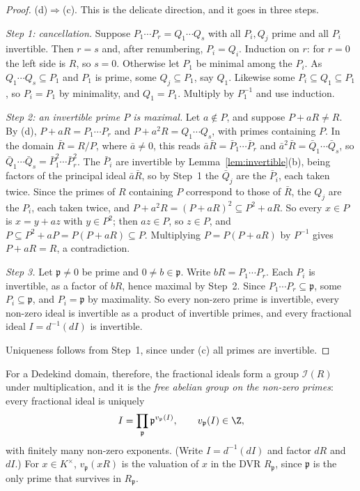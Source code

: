 \begin{proof}
(d)$\Rightarrow$(c). This is the delicate direction, and it goes in three steps.

\emph{Step 1: cancellation.} Suppose $P_1\cdots P_r=Q_1\cdots Q_s$ with all $P_i,Q_j$ prime and all $P_i$ invertible. Then $r=s$ and, after renumbering, $P_i=Q_i$. Induction on $r$: for $r=0$ the left side is $R$, so $s=0$.
Otherwise let $P_1$ be minimal among the $P_i$. As $Q_1\cdots Q_s\subseteq P_1$ and $P_1$ is prime, some $Q_j\subseteq P_1$, say $Q_1$. Likewise some $P_i\subseteq Q_1\subseteq P_1$, so $P_i=P_1$ by minimality, and $Q_1=P_1$. Multiply by $P_1^{-1}$ and use induction.

\emph{Step 2: an invertible prime $P$ is maximal.} Let $a\notin P$, and suppose $P+aR\ne R$. By (d), $P+aR=P_1\cdots P_r$ and $P+a^2R=Q_1\cdots Q_s$, with primes containing $P$. In the domain $\bar R=R/P$, where $\bar a\ne0$,
this reads $\bar a\bar R=\bar P_1\cdots\bar P_r$ and $\bar a^2\bar R=\bar Q_1\cdots\bar Q_s$, so $\bar Q_1\cdots\bar Q_s=\bar P_1^2\cdots\bar P_r^2$. The $\bar P_i$ are invertible by Lemma~\ref{lem:invertible}(b), being factors of the
principal ideal $\bar a\bar R$, so by Step~1 the $\bar Q_j$ are the $\bar P_i$, each taken twice. Since the primes of $R$ containing $P$ correspond to those of $\bar R$, the $Q_j$ are the $P_i$, each taken twice, and $P+a^2R=(P+aR)^2\subseteq P^2+aR$. So every $x\in P$ is $x=y+az$ with $y\in P^2$; then $az\in P$, so $z\in P$, and
$P\subseteq P^2+aP=P(P+aR)\subseteq P$. Multiplying $P=P(P+aR)$ by $P^{-1}$ gives $P+aR=R$, a contradiction.

\emph{Step 3.} Let $\mathfrak p\ne0$ be prime and $0\ne b\in\mathfrak p$. Write $bR=P_1\cdots P_r$. Each $P_i$ is invertible, as a factor of $bR$, hence maximal by Step~2. Since $P_1\cdots P_r\subseteq\mathfrak p$, some $P_i\subseteq\mathfrak p$,
and $P_i=\mathfrak p$ by maximality. So every non-zero prime is invertible, every non-zero ideal is invertible as a product of invertible primes, and every fractional ideal $I=d^{-1}(dI)$ is invertible.

Uniqueness follows from Step~1, since under (c) all primes are invertible.
\end{proof}

For a Dedekind domain, therefore, the fractional ideals form a group $\mathcal I(R)$ under multiplication, and it is the \emph{free abelian group on the non-zero primes}: every fractional ideal is uniquely
\[
I=\prod_{\mathfrak p}\mathfrak p^{v_{\mathfrak p}(I)},\qquad v_{\mathfrak p}(I)\in\Z,
\]
with finitely many non-zero exponents. (Write $I=d^{-1}(dI)$ and factor $dR$ and $dI$.) For $x\in K^\times$, $v_{\mathfrak p}(xR)$ is the valuation of $x$ in the DVR $R_{\mathfrak p}$, since $\mathfrak p$ is the only prime that survives in
$R_{\mathfrak p}$.

